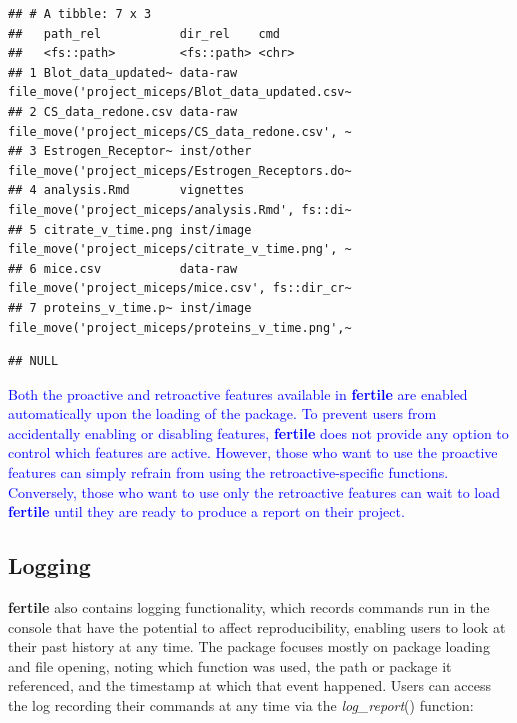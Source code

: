\documentclass[APA,LATO1COL]{WileyNJD-v2}\usepackage[]{graphicx}\usepackage[]{color}
\makeatletter
\newenvironment{kframe}{%
 \def\at@end@of@kframe{}%
 \ifinner\ifhmode%
  \def\at@end@of@kframe{\end{minipage}}%
  \begin{minipage}{\columnwidth}%
 \fi\fi%
 \def\FrameCommand##1{\hskip\@totalleftmargin \hskip-\fboxsep
 \colorbox{shadecolor}{##1}\hskip-\fboxsep
     \hskip-\linewidth \hskip-\@totalleftmargin \hskip\columnwidth}%
 \MakeFramed {\advance\hsize-\width
   \@totalleftmargin\z@ \linewidth\hsize
   \@setminipage}}%
 {\par\unskip\endMakeFramed%
 \at@end@of@kframe}
\newenvironment{knitrout}{}{} %
\newcommand{\pkg}[1]{\textbf{#1}}
\newcommand{\func}[1]{\textit{#1}()}
\makeatother
\begin{document}
\begin{knitrout}
\begin{kframe}
{\ttfamily\noindent\itshape\color{messagecolor}{\#\# --\ \  Suggestions for moving files -------------------------------------- fertile 0.0.0.9028 --}}\begin{verbatim}
## # A tibble: 7 x 3
##   path_rel           dir_rel    cmd                                             
##   <fs::path>         <fs::path> <chr>                                           
## 1 Blot_data_updated~ data-raw   file_move('project_miceps/Blot_data_updated.csv~
## 2 CS_data_redone.csv data-raw   file_move('project_miceps/CS_data_redone.csv', ~
## 3 Estrogen_Receptor~ inst/other file_move('project_miceps/Estrogen_Receptors.do~
## 4 analysis.Rmd       vignettes  file_move('project_miceps/analysis.Rmd', fs::di~
## 5 citrate_v_time.png inst/image file_move('project_miceps/citrate_v_time.png', ~
## 6 mice.csv           data-raw   file_move('project_miceps/mice.csv', fs::dir_cr~
## 7 proteins_v_time.p~ inst/image file_move('project_miceps/proteins_v_time.png',~
\end{verbatim}


{\ttfamily\noindent\itshape\color{messagecolor}{\#\# --\ \  Problematic paths logged ------------------------------------------ fertile 0.0.0.9028 --}}\begin{verbatim}
## NULL
\end{verbatim}
\end{kframe}
\end{knitrout}

\textcolor{blue}{Both the proactive and retroactive features available in \pkg{fertile} are enabled automatically upon the loading of the package. To prevent users from accidentally enabling or disabling features, \pkg{fertile} does not provide any option to control which features are active. However, those who want to use the proactive features can simply  refrain from using the retroactive-specific functions.
Conversely, those who want to use only the retroactive features can wait to load \pkg{fertile} until they are ready to produce a report on their project.}

\subsection{Logging}

\pkg{fertile} also contains logging functionality, which records commands run in the console that have the potential to affect reproducibility, enabling users to look at their past history at any time. The package focuses mostly on package loading and file opening, noting which function was used, the path or package it referenced, and the timestamp at which that event happened. Users can access the log recording their commands at any time via the \func{log\_report} function:
\end{document}
